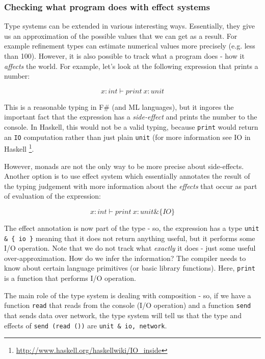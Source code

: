 \subsubsection{Checking what program does with effect systems}

Type systems can be extended in various interesting ways. Essentially, they give us an approximation
of the possible values that we can get as a result. For example refinement types \cite{xx}
can estimate numerical values more precisely (e.g. less than 100). However, it is also possible to 
track what a program does - how it \emph{affects} the world. For example, let's look at the following
expression that prints a number:

\begin{equation}
x:int \vdash print~x : unit
\end{equation}

This is a reasonable typing in F\# (and ML languages), but it ingores the important fact that the 
expression has a \emph{side-effect} and prints the number to the console. In Haskell, this would not be
a valid typing, because \texttt{print} would return an \texttt{IO} computation rather than just plain \texttt{unit} (for
more information see IO in Haskell \footnote{\url{http://www.haskell.org/haskellwiki/IO_inside}}.

However, monads are not the only way to be more precise about side-effects. Another option is
to use effect system \cite{xx} which essentially annotates the 
result of the typing judgement with more information about the \emph{effects} that occur as part of
evaluation of the expression:

\begin{equation}
x:int \vdash print~x : unit \& \{ IO \}
\end{equation}

The effect annotation is now part of the type - so, the expression has a type \texttt{unit \& \{ io \}} meaning
that it does not return anything useful, but it performs some I/O operation. Note that we do not track
what \emph{exactly} it does - just some useful over-approximation. How do we infer the information?
The compiler needs to know about certain language primitives (or basic library functions). Here, 
\texttt{print} is a function that performs I/O operation.

The main role of the type system is dealing with composition - so, if we have a function \texttt{read} that
reads from the console (I/O operation) and a function \texttt{send} that sends data over network, the type
system will tell us that the type and effects of \texttt{send (read ())} are \texttt{unit \& {io, network}}.

